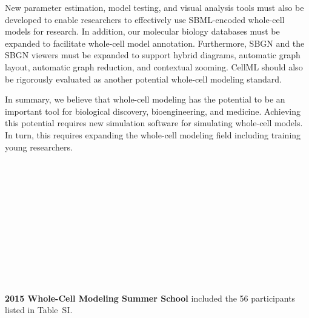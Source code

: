\documentclass[journal,transmag]{IEEEtran}
\begin{document}
New parameter estimation, model testing, and visual analysis tools must also be developed to enable researchers to effectively use SBML-encoded whole-cell models for research. In addition, our molecular biology databases must be expanded to facilitate whole-cell model annotation. Furthermore, SBGN and the SBGN viewers must be expanded to support hybrid diagrams, automatic graph layout, automatic graph reduction, and contextual zooming. CellML should also be rigorously evaluated as another potential whole-cell modeling standard.

In summary, we believe that whole-cell modeling has the potential to be an important tool for biological discovery, bioengineering, and medicine. Achieving this potential requires new simulation software for simulating whole-cell models. In turn, this requires expanding the whole-cell modeling field including training young researchers.

\ifCLASSOPTIONcaptionsoff
  \newpage
\fi




% 

\begin{IEEEbiography}{}
~\\
~\\
~\\
~\\
~\\
~\\
~\\
~\\
~\\
~\\
~\\
\textbf{2015 Whole-Cell Modeling Summer School} included the 56 participants listed in Table~SI.
\end{IEEEbiography}


\end{document}
